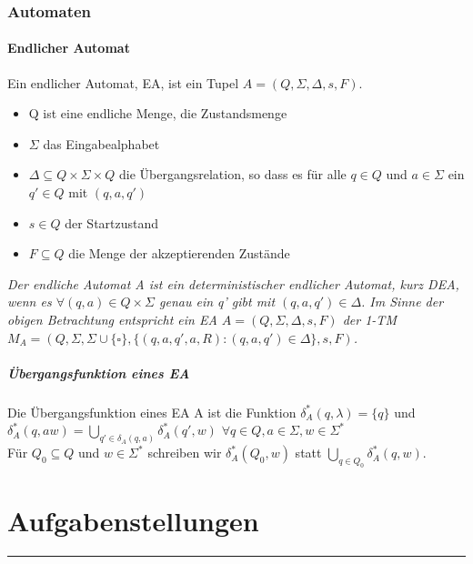 \documentclass[DIV=15]{scrartcl}
\begin{document}
\section{Automaten}
    \subsection{Endlicher Automat}
        Ein endlicher Automat, EA, ist ein Tupel \(A=(Q,\Sigma,\Delta,s,F)\).
        \begin{itemize}
            \item Q ist eine endliche Menge, die Zustandsmenge 
            \item \(\Sigma\) das Eingabealphabet
            \item \(\Delta\subseteq Q\times\Sigma\times Q \) die Übergangsrelation, so dass es 
            für alle \(q\in Q\) und \(a\in\Sigma\) ein \(q'\in Q\) mit \((q,a,q')\)
            \item \(s\in Q\) der Startzustand 
            \item \(F\subseteq Q\) die Menge der akzeptierenden Zustände
        \end{itemize}
        \textit{Der endliche Automat A ist ein deterministischer endlicher Automat, kurz DEA, wenn es
        \(\forall(q,a)\in Q\times\Sigma\) genau ein q' gibt mit \((q,a,q')\in\Delta\).
        Im Sinne der obigen Betrachtung entspricht ein EA \(A=(Q,\Sigma,\Delta,s,F)\) der 1-TM
        \(M_A=(Q,\Sigma,\Sigma\cup\{\square\},\{(q,a,q',a,R):(q,a,q')\in\Delta\},s,F)\).} 
        \subsubsection{Übergangsfunktion eines EA}
            Die Übergangsfunktion eines EA A ist die Funktion \(\delta _A^*(q,\lambda)=\{q\}\) und 
            \(\delta_A^*(q,aw)=\bigcup\limits_{q'\in\delta_A(q,a)}\delta_A^*(q',w)\) 
            \(\forall q\in Q,a\in\Sigma, w\in\Sigma^*\)\\
            Für \(Q_0\subseteq Q\) und \(w\in\Sigma^*\) schreiben wir \(\delta_A^*(Q_0,w)\) statt 
            \(\bigcup\limits_{q\in Q_0}\delta_A^*(q,w)\).
\newpage
\part{Aufgabenstellungen}
\rule{467.1pt}{0.4pt}
\end{document}
